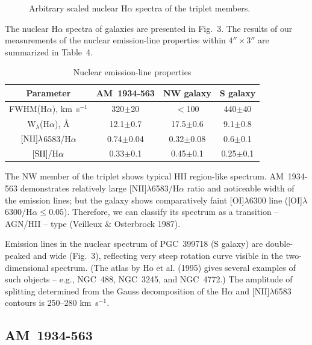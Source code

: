 \documentclass[]{aa}
\begin{document}
\begin{figure}
\centerline{}
\caption{Arbitrary scaled nuclear H$\alpha$ spectra of the triplet members.}
\end{figure}

The nuclear H$\alpha$ spectra of galaxies are presented in Fig.~3. 
The results of our measurements of the nuclear emission-line properties 
within $4'' \times 3''$ are summarized in Table~4.

\begin{table}
\centering
\begin{tabular}{cccc}
\hline 
\hline
 Parameter & AM~1934-563 & NW galaxy &  S galaxy  \\
\hline                   
{\scriptsize FWHM(H$\alpha$), km~s$^{-1}$} & 320$\pm$20 & $<$100  & 440$\pm$40  \\
{\scriptsize W$_{\lambda}$(H$\alpha$), \AA} & 12.1$\pm$0.7 & 17.5$\pm$0.6 & 9.1$\pm$0.8    \\
{\scriptsize $\rm [NII]\lambda$6583/H$\alpha$} & 0.74$\pm$0.04 & 0.32$\pm$0.08 & 0.6$\pm$0.1   \\
{\scriptsize $\rm [SII]/H\alpha$}  & 0.33$\pm$0.1 & 0.45$\pm$0.1 & 0.25$\pm$0.1  \\
\hline 
\end{tabular}
\caption{Nuclear emission-line properties}
\end{table}

The NW member of the triplet shows typical HII region-like spectrum. 
AM~1934-563 demonstrates relatively large
[NII]$\lambda$6583/H$\alpha$ ratio and noticeable width of the
emission lines; but the galaxy shows comparatively faint
[OI]$\lambda$6300 line ([OI]$\lambda$6300/H$\alpha \leq 0.05$).
Therefore, we can classify its spectrum as a transition 
-- AGN/HII -- type (Veilleux \& Osterbrock 1987). 

Emission lines in the nuclear spectrum of PGC~399718
(S galaxy) are double-peaked and wide (Fig.~3), reflecting very
steep rotation curve visible in the two-dimensional spectrum.
(The atlas by Ho et al. (1995) gives several examples of such
objects -- e.g., NGC~488, NGC~3245, and NGC~4772.)
The amplitude of splitting determined from the Gauss decomposition
of the H$\alpha$ and [NII]$\lambda$6583 contours is
250--280 km~s$^{-1}$. 

\subsection{AM~1934-563}
\end{document}
